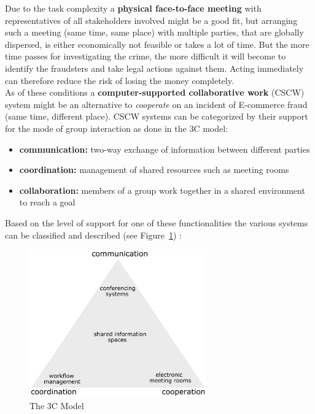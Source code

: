 Due to the task complexity a \textbf{physical face-to-face meeting} with representatives of all stakeholders involved might be a good fit, but arranging such a meeting (same time, same place) with multiple parties, that are globally dispersed, is either economically not feasible or takes a lot of time. But the more time passes for investigating the crime, the more difficult it will become to identify the fraudsters and take legal actions against them. Acting immediately can therefore reduce the risk of losing the money completely. \\

As of these conditions a \textbf{computer-supported collaborative work} (CSCW) system might be an alternative to \textit{cooperate} on an incident of E-commerce fraud (same time, different place). CSCW systems can be categorized by their support for the mode of group interaction as done in the 3C model: \@

\begin{itemize}
    \item\textbf{communication:} two-way exchange of information between different parties
    \item\textbf{coordination:} management of shared resources such as meeting rooms
    \item\textbf{collaboration:} members of a group work together in a shared environment to reach a goal
\end{itemize}

Based on the level of support for one of these functionalities the various systems can be classified and described (see Figure~\ref{fig:images_3C_model}) \citep{Koch2008}: \@

\begin{figure}[H]
	\centering
		\includegraphics[height=2.5in]{images/3C-model.pdf}
	\caption{The 3C Model \citep{Koch2008}}
\label{fig:images_3C_model}
\end{figure}

